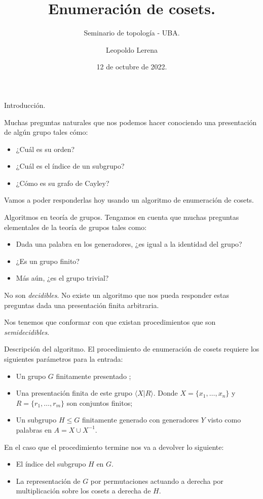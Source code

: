 \documentclass[aspectratio=169, 9pt]{beamer}
\title{Enumeración de cosets.}
\subtitle{Seminario de topología - UBA.}
\date{12 de octubre de 2022.}
\author{Leopoldo Lerena}
\institute{Universidad de Buenos Aires}
\newcommand{\fg}{finitamente generado }
\newcommand{\fp}{finitamente presentado }
\begin{document}
\maketitle

\begin{frame}[fragile]{Introducción.}


Muchas preguntas naturales que nos podemos hacer conociendo una presentación de algún grupo tales cómo:

\begin{itemize}
	\item ¿Cuál es su orden?
	\pause
	\item ¿Cuál es 	el índice de un subgrupo?
	\pause
	\item ¿Cómo es su grafo de Cayley?
	\pause
\end{itemize}

Vamos a poder responderlas hoy usando un algoritmo de enumeración de cosets.
\end{frame}

\begin{frame}[fragile]{Algoritmos en teoría de grupos.}
	Tengamos en cuenta que muchas preguntas elementales de la teoría de grupos tales como:
	\begin{itemize}
		\item Dada una palabra en los generadores, ¿es igual a la identidad del grupo?
		\pause
		\item ¿Es un grupo finito?
		\pause
		\item Más aún, ¿es el grupo trivial?
	\end{itemize}
	\pause
	No son \textit{decidibles}. 
	No existe un algoritmo que nos pueda responder estas preguntas dada una presentación finita arbitraria.
	\medskip
	
	\pause
	
	
	Nos tenemos que conformar con que existan procedimientos que son \textit{semidecidibles}. 
\end{frame}

\begin{frame}[fragile]{Descripción del algoritmo.}
	El procedimiento de enumeración de cosets requiere los siguientes parámetros para la entrada:
	\begin{itemize}
		\item Un grupo $G$ \fp;
		\pause
		\item Una presentación finita de este grupo $\langle X | R \rangle$.
			Donde $X = \{ x_1, \dots, x_n \}$ y $R = \{ r_1, \dots, r_m \}$ son conjuntos finitos;
 		\pause
		\item Un subgrupo $H \le G$  \fg con generadores $Y$ visto como palabras en $A = X \cup X^{-1}$.
	\end{itemize}
	\pause
	\medskip
	
	En el caso que el procedimiento termine nos va a devolver lo siguiente:
	\pause
	\begin{itemize}
		\item El índice del subgrupo $H$ en $G$.
		\pause
		\item La representación de $G$ por permutaciones actuando a derecha por multiplicación sobre los cosets a derecha de $H$.
	\end{itemize}  
\end{frame}
\end{document}
